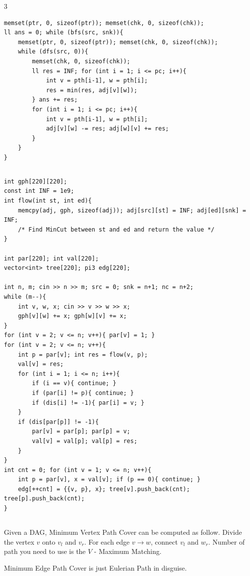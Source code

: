 \documentclass[landscape, 8pt, a4paper, oneside]{extarticle}
\begin{document}
\begin{multicols*}{3}
\begin{verbatim}
memset(ptr, 0, sizeof(ptr)); memset(chk, 0, sizeof(chk));
ll ans = 0; while (bfs(src, snk)){
	memset(ptr, 0, sizeof(ptr)); memset(chk, 0, sizeof(chk));
	while (dfs(src, 0)){
		memset(chk, 0, sizeof(chk));
		ll res = INF; for (int i = 1; i <= pc; i++){
			int v = pth[i-1], w = pth[i];
			res = min(res, adj[v][w]);
		} ans += res;
		for (int i = 1; i <= pc; i++){
			int v = pth[i-1], w = pth[i];
			adj[v][w] -= res; adj[w][v] += res;
		}
	}
}
\end{verbatim}
\subsection{}
\begin{verbatim}
int gph[220][220];
const int INF = 1e9;
int flow(int st, int ed){
	memcpy(adj, gph, sizeof(adj)); adj[src][st] = INF; adj[ed][snk] = INF;
	/* Find MinCut between st and ed and return the value */
}

int par[220]; int val[220];
vector<int> tree[220]; pi3 edg[220];

int n, m; cin >> n >> m; src = 0; snk = n+1; nc = n+2;
while (m--){
	int v, w, x; cin >> v >> w >> x;
	gph[v][w] += x; gph[w][v] += x;
}
for (int v = 2; v <= n; v++){ par[v] = 1; }
for (int v = 2; v <= n; v++){
	int p = par[v]; int res = flow(v, p);
	val[v] = res;
	for (int i = 1; i <= n; i++){
		if (i == v){ continue; }
		if (par[i] != p){ continue; }
		if (dis[i] != -1){ par[i] = v; }
	}
	if (dis[par[p]] != -1){
		par[v] = par[p]; par[p] = v;
		val[v] = val[p]; val[p] = res;
	}
}
int cnt = 0; for (int v = 1; v <= n; v++){
	int p = par[v], x = val[v]; if (p == 0){ continue; }
	edg[++cnt] = {{v, p}, x}; tree[v].push_back(cnt); tree[p].push_back(cnt);
}
\end{verbatim}
\subsection{}
Given a DAG, Minimum Vertex Path Cover can be computed as follow.
Divide the vertex $v$ onto $v_l$ and $v_r$. For each edge $v \rightarrow w$, connect $v_l$ and $w_r$.
Number of path you need to use is the $V$ - Maximum Matching.

Minimum Edge Path Cover is just Eulerian Path in disguise.

\end{multicols*}
\end{document}
